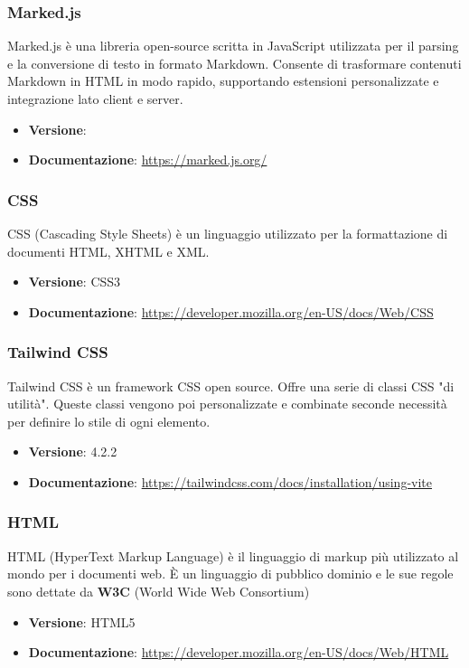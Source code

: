 \documentclass[a4paper,10pt]{article}
\begin{document}
\subsubsection{Marked.js}
Marked.js è una libreria open-source scritta in JavaScript utilizzata per il parsing e la conversione di testo in formato Markdown. Consente di trasformare contenuti Markdown in HTML in modo rapido, supportando estensioni personalizzate e integrazione lato client e server.
\begin{itemize}
    \item \textbf{Versione}:
    \item \textbf{Documentazione}: \url{https://marked.js.org/}
\end{itemize}

\subsubsection{CSS}
CSS (Cascading Style Sheets) è un linguaggio utilizzato per la formattazione di documenti HTML, XHTML e XML.
\begin{itemize}
    \item \textbf{Versione}: CSS3
    \item \textbf{Documentazione}: \url{https://developer.mozilla.org/en-US/docs/Web/CSS}
\end{itemize}

\subsubsection{Tailwind CSS}
Tailwind CSS è un framework CSS open source. Offre una serie  di classi CSS "di utilità". Queste classi vengono poi personalizzate e combinate seconde necessità per definire lo stile di ogni elemento.
\begin{itemize}
    \item \textbf{Versione}: 4.2.2
    \item \textbf{Documentazione}: \url{https://tailwindcss.com/docs/installation/using-vite}
\end{itemize}

\subsubsection{HTML}
HTML (HyperText Markup Language) è il linguaggio di markup più utilizzato al mondo per i documenti web. È un linguaggio di pubblico dominio e le sue regole sono dettate da \textbf{W3C} (World Wide Web Consortium)
\begin{itemize}
    \item \textbf{Versione}: HTML5
    \item \textbf{Documentazione}: \url{https://developer.mozilla.org/en-US/docs/Web/HTML}
\end{itemize}
\end{document}
